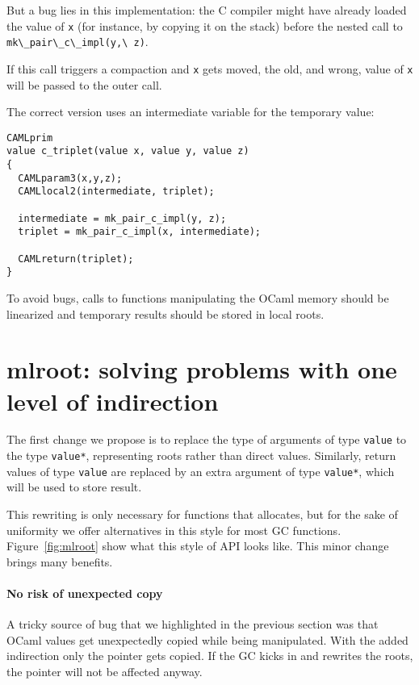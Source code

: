 \documentclass[a4paper]{easychair}
\newcommand{\cpp}[1]{\lstinline[style=C++]{#1}}
\begin{document}
But a bug lies in this implementation: the C compiler might have already
loaded the value of \cpp{x} (for instance, by copying it on the
stack) before the nested call to \cpp{mk\_pair\_c\_impl(y,\ z)}.

If this call triggers a compaction and \cpp{x} gets moved, the old,
and wrong, value of \cpp{x} will be passed to the outer call.

The correct version uses an intermediate variable for the temporary
value:
%
\begin{lstlisting}[style=C++]
CAMLprim
value c_triplet(value x, value y, value z)
{
  CAMLparam3(x,y,z);
  CAMLlocal2(intermediate, triplet);

  intermediate = mk_pair_c_impl(y, z);
  triplet = mk_pair_c_impl(x, intermediate);

  CAMLreturn(triplet);
}
\end{lstlisting}

To avoid bugs, calls to functions manipulating the OCaml memory should be
linearized and temporary results should be stored in local roots.

\section{mlroot: solving problems with one level of indirection}

The first change we propose is to replace the type of arguments of type \cpp{value}
to the type \cpp{value*}, representing roots rather than direct values.
Similarly, return values of type \cpp{value} are replaced by an extra argument
of type \cpp{value*}, which will be used to store result.

This rewriting is only necessary for functions that allocates, but for the sake
of uniformity we offer alternatives in this style for most GC functions.
Figure~\ref{fig:mlroot} show what this style of API looks like.
This minor change brings many benefits.

\paragraph{No risk of unexpected copy}

A tricky source of bug that we highlighted in the previous section was
that OCaml values get unexpectedly copied while being manipulated. With
the added indirection only the pointer gets copied. If the GC kicks in and
rewrites the roots, the pointer will not be affected anyway.
\end{document}
